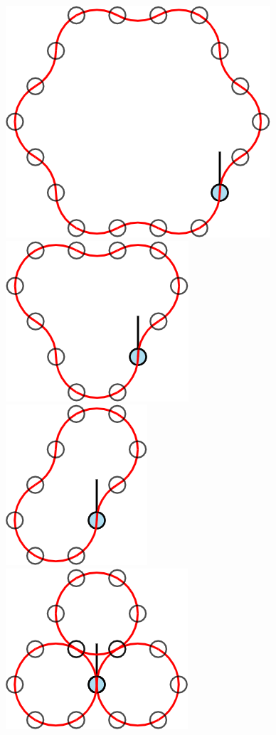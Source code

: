 \documentclass{article}
\begin{document}
\begin{figure}[ht!]
  \centering
  \includegraphics[scale=0.12]{assets/069_problem_robot_walks/6-robot_1_2.png}
  \includegraphics[scale=0.12]{assets/069_problem_robot_walks/6-robot_1_3.png}
  \includegraphics[scale=0.12]{assets/069_problem_robot_walks/6-robot_1_4.png}
  \includegraphics[scale=0.12]{assets/069_problem_robot_walks/6-robot_1_5.png}

\end{figure}
\end{document}
